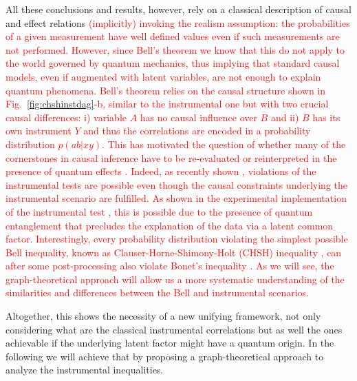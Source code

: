 \documentclass[letterpaper]{article}
\begin{document}
All these conclusions and results, however, rely on a classical
description of causal and effect relations \textcolor{red}{(implicitly)
invoking the realism assumption: the probabilities of a given
measurement have well defined values even if such measurements are not
performed. However, since Bell's theorem \cite{bell1964} we know that
this do not apply to the world governed by quantum mechanics, thus
implying that standard causal models, even if augmented with latent
variables, are not enough to explain quantum phenomena. Bell's theorem
relies on the causal structure shown in Fig.~\ref{fig:chshinstdag}-b,
similar to the instrumental one but with two crucial causal differences:
i) variable $A$ has no causal influence over $B$ and ii) $B$ has
its own instrument $Y$ and thus the correlations are encoded in a
probability distribution $p(ab \vert xy)$. This has motivated the
question of whether many of the cornerstones in causal inference
have to be re-evaluated or reinterpreted in the presence of quantum
effects \cite{ried2015,Costa2016,Wolfe2016,gonz1,gonz2}. Indeed, as recently
shown \cite{chaves2018}, violations of the instrumental tests are
possible even though the causal constraints underlying the instrumental
scenario are fulfilled. As shown in the experimental implementation
of the instrumental test \cite{chaves2018}, this is possible due to
the presence of quantum entanglement that precludes the explanation of
the data via a latent common factor. Interestingly, every probability
distribution violating the simplest possible Bell inequality, known as
Clauser-Horne-Shimony-Holt (CHSH) inequality \cite{CHSH}, can after some
post-processing also violate Bonet's inequality \cite{himbeeck2018}. As we
will see, the graph-theoretical approach will allow us a more systematic
understanding of the similarities and differences between the Bell and
instrumental scenarios.}

Altogether, this shows the necessity of a new unifying framework, not
only considering what are the classical instrumental correlations but
as well the ones achievable if the underlying latent factor might have
a quantum origin. In the following we will achieve that by proposing a
graph-theoretical approach to analyze the instrumental inequalities.
\end{document}
